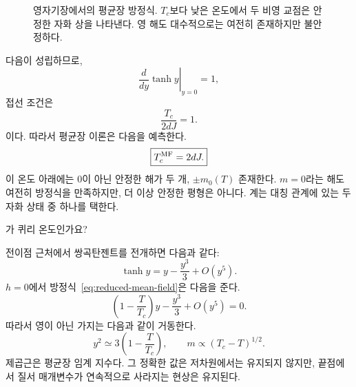 \begin{figure}[ht]
\centering
{}
\caption{영자기장에서의 평균장 방정식. \(T_c\)보다 낮은 온도에서 두 비영 교점은 안정한 자화 상을 나타낸다. 영 해도 대수적으로는 여전히 존재하지만 불안정하다.}
\label{fig:mean-field-intersections}
\end{figure}

다음이 성립하므로,
\begin{equation}
\left.\frac{d}{dy}\tanh y\right|_{y=0}=1,
\end{equation}
접선 조건은
\begin{equation}
\frac{T_c}{2dJ}=1.
\end{equation}
이다. 따라서 평균장 이론은 다음을 예측한다.
\begin{equation}
\boxed{T_c^{\rm MF}=2dJ.}
\label{eq:sm10-mean-field-tc}
\end{equation}
이 온도 아래에는 0이 아닌 안정한 해가 두 개, \(\pm m_0(T)\) 존재한다. \(m=0\)라는 해도 여전히 방정식을 만족하지만, 더 이상 안정한 평형은 아니다. 계는 대칭 관계에 있는 두 자화 상태 중 하나를 택한다.

\begin{classroomqa}
\audiencequestion{}가 퀴리 온도인가요?
\end{classroomqa}

전이점 근처에서 쌍곡탄젠트를 전개하면 다음과 같다:
\begin{equation}
\tanh y=y-\frac{y^3}{3}+O(y^5).
\end{equation}
\(h=0\)에서 방정식~\eqref{eq:reduced-mean-field}은 다음을 준다.
\begin{equation}
\left(1-\frac{T}{T_c}\right)y-\frac{y^3}{3}+O(y^5)=0.
\end{equation}
따라서 영이 아닌 가지는 다음과 같이 거동한다.
\begin{equation}
y^2\simeq3\left(1-\frac{T}{T_c}\right),
\qquad
m\propto(T_c-T)^{1/2}.
\label{eq:mf-beta-exponent}
\end{equation}
제곱근은 평균장 임계 지수다. 그 정확한 값은 저차원에서는 유지되지 않지만, 끝점에서 질서 매개변수가 연속적으로 사라지는 현상은 유지된다.

